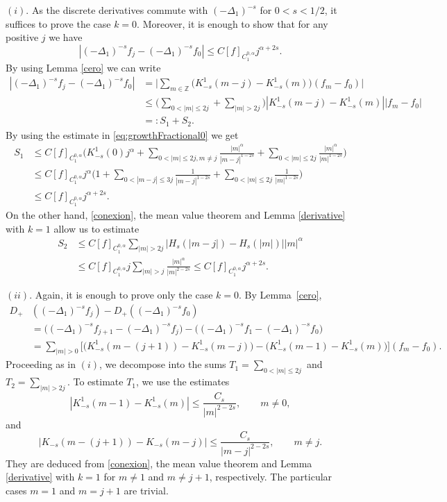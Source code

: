 \documentclass[a4paper,11pt,reqno]{amsart}
\newcommand{\Z}{\mathbb{Z}}
\theoremstyle{definition}
\numberwithin{equation}{section}
\begin{document}
\noindent $(i).$ As the discrete derivatives commute with $(-\Delta_1)^{-s}$ for $0<s<1/2$,
it suffices to prove the case $k=0$.
Moreover, it is enough to show that for any positive $j$ we have
$$
|(-\Delta_1)^{-s}f_j-(-\Delta_1)^{-s}f_0|\le C[f]_{C_1^{0,\alpha}}j^{\alpha+2s}.
$$
By using Lemma \ref{cero} we can write
\begin{align*}
|(-\Delta_1)^{-s} f_j-  (-\Delta_1)^{-s} f_0|&=
\bigg|\sum_{m\in\Z}\big(K^1_{-s}(m-j)-K^1_{-s}(m)\big)(f_m-f_0)\bigg| \\
&\le \Big(\sum_{0<|m|\le 2j}+ \sum_{|m|>2j}\Big)|K^1_{-s}(m-j)-K^1_{-s}(m)||f_m-f_0| \\
&=:  S_1+S_2.
\end{align*}
By using the estimate in \eqref{eq:growthFractional0} we get
\begin{align*}
S_1 & \le  C[ f]_{C_1^{0,\alpha}}\bigg(K^1_{-s}(0) j^\alpha+
\sum_{0<|m|\le 2j,m\neq j}  \frac{|m|^\alpha}{|m-j|^{1-2s}} +
\sum_{0<|m|\le2j}  \frac{|m|^\alpha}{|m|^{1-2s}}\bigg) \\
&\le C[f]_{C^{0,\alpha}_1}j^\alpha\bigg(1+\sum_{0<|m-j|\le3j}\frac1{|m-j|^{1-2s}} +
 \sum_{0<|m|\le 2j}  \frac1{|m|^{1-2s}}\bigg) \\
& \le  C [f]_{C^{0,\alpha}_1}j^{\alpha+2s}.
\end{align*}
On the other hand, \eqref{conexion}, the mean value theorem and Lemma \ref{derivative} with $k=1$ allow us to estimate
 \begin{align*}
S_2 &\le C [f]_{C_1^{0,\alpha}}\sum_{|m|> 2j}|H_s(|m-j|)- H_s(|m|)||m|^\alpha \\
&\le C [ f]_{C_1^{0,\alpha}}j \sum_{|m|> j}  \frac{|m|^\alpha}{|m|^{2-2s}} \le
 C [f]_{C_1^{0,\alpha}} j^{\alpha+2s}.
\end{align*}

\noindent$(ii).$ Again, it is enough to prove only the case $k=0$. By Lemma~\ref{cero},
\begin{align*}
D_+&((-\Delta_1)^{-s}f_j)-D_+((-\Delta_1)^{-s}f_0) \\
&=\big((-\Delta_1)^{-s}f_{j+1}-(-\Delta_1)^{-s}f_j\big)-\big((-\Delta_1)^{-s}f_1-(-\Delta_1)^{-s}f_0\big) \\
&=\sum_{|m|>0}\Big[\big(K^1_{-s}(m-(j+1))-K^1_{-s}(m-j)\big)-\big(K^1_{-s}(m-1)-K^1_{-s}(m)\big)\Big](f_m-f_0).
\end{align*}
Proceeding as in $(i)$, we decompose into the sums
$T_1=\sum_{0<|m|\le2j}$ and $T_2=\sum_{|m|>2j}$. To estimate $T_1$,
we use the estimates
$$
|K^1_{-s}(m-1) - K^1_{-s}(m)|\le\frac{C_s}{|m|^{2-2s}}, \qquad m\neq 0,
$$
and
$$
|K_{-s}(m-(j+1))- K_{-s}(m-j)| \le\frac{C_s}{|m-j|^{2-2s}}, \qquad m\neq j.
$$ 
They are deduced from \eqref{conexion}, the mean value theorem and Lemma \ref{derivative} with $k=1$ for $m\neq 1$ and $m\neq j+1$, respectively. The particular cases $m=1$ and $m=j+1$ are trivial.
\end{document}
